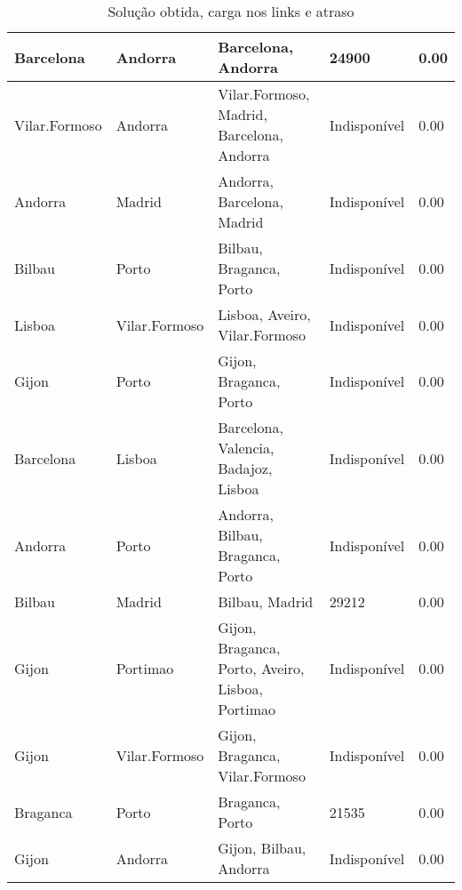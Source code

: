 \begin{table}[!htb]
{\begin{tabular}{|l|l|l|l|l|}
Barcelona & Andorra & Barcelona, Andorra & 24900 & 0.00 \\ \hline
Vilar.Formoso & Andorra & Vilar.Formoso, Madrid, Barcelona, Andorra & Indisponível & 0.00 \\ \hline
Andorra & Madrid & Andorra, Barcelona, Madrid & Indisponível & 0.00 \\ \hline
Bilbau & Porto & Bilbau, Braganca, Porto & Indisponível & 0.00 \\ \hline
Lisboa & Vilar.Formoso & Lisboa, Aveiro, Vilar.Formoso & Indisponível & 0.00 \\ \hline
Gijon & Porto & Gijon, Braganca, Porto & Indisponível & 0.00 \\ \hline
Barcelona & Lisboa & Barcelona, Valencia, Badajoz, Lisboa & Indisponível & 0.00 \\ \hline
Andorra & Porto & Andorra, Bilbau, Braganca, Porto & Indisponível & 0.00 \\ \hline
Bilbau & Madrid & Bilbau, Madrid & 29212 & 0.00 \\ \hline
Gijon & Portimao & Gijon, Braganca, Porto, Aveiro, Lisboa, Portimao & Indisponível & 0.00 \\ \hline
Gijon & Vilar.Formoso & Gijon, Braganca, Vilar.Formoso & Indisponível & 0.00 \\ \hline
Braganca & Porto & Braganca, Porto & 21535 & 0.00 \\ \hline
Gijon & Andorra & Gijon, Bilbau, Andorra & Indisponível & 0.00 \\ \hline
\end{tabular}}
\caption[]{Solução obtida, carga nos links e atraso}
\end{table}

